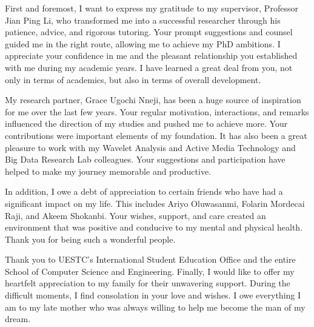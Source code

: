 \documentclass{standalone}
\begin{document}
\thesisacknowledgement
First and foremost, I want to express my gratitude to my supervisor, Professor Jian Ping Li, who transformed me into a successful researcher through his patience, advice, and rigorous tutoring. Your prompt suggestions and counsel guided me in the right route, allowing me to achieve my PhD ambitions. I appreciate your confidence in me and the pleasant relationship you established with me during my academic years. I have learned a great deal from you, not only in terms of academics, but also in terms of overall development.

My research partner, Grace Ugochi Nneji, has been a huge source of inspiration for me over the last few years. Your regular motivation, interactions, and remarks influenced the direction of my studies and pushed me to achieve more. Your contributions were important elements of my foundation. It has also been a great pleasure to work with my Wavelet Analysis and Active Media Technology and Big Data Research Lab colleagues. Your suggestions and participation have helped to make my journey memorable and productive.

In addition, I owe a debt of appreciation to certain friends who have had a significant impact on my life. This includes Ariyo Oluwasanmi, Folarin Mordecai Raji, and Akeem Shokanbi. Your wishes, support, and care created an environment that was positive and conducive to my mental and physical health. Thank you for being such a wonderful people.

Thank you to UESTC's International Student Education Office and the entire School of Computer Science and Engineering. Finally, I would like to offer my heartfelt appreciation to my family for their unwavering support. During the difficult moments, I find consolation in your love and wishes. I owe everything I am to my late mother who was always willing to help me become the man of my dream.
\end{document}
